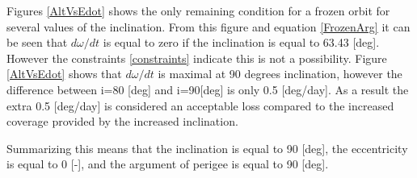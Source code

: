 \documentclass{article}
\begin{document}
Figures \ref{AltVsEdot} shows the only remaining condition for a frozen orbit for several values of the inclination. From this figure and equation \ref{FrozenArg} it can be seen that $d\omega/dt$ is equal to zero if the inclination is equal to 63.43 [deg]. However the constraints \ref{constraints} indicate this is not a possibility. Figure \ref{AltVsEdot} shows that $d\omega/dt$ is maximal at 90 degrees inclination, however the difference between i=80 [deg] and i=90[deg] is only 0.5 [deg/day]. As a result the extra 0.5 [deg/day] is considered an acceptable loss compared to the increased coverage provided by the increased inclination.

Summarizing this means that the inclination is equal to 90 [deg], the eccentricity is equal to 0 [-], and the argument of perigee is equal to 90 [deg].
\end{document}

